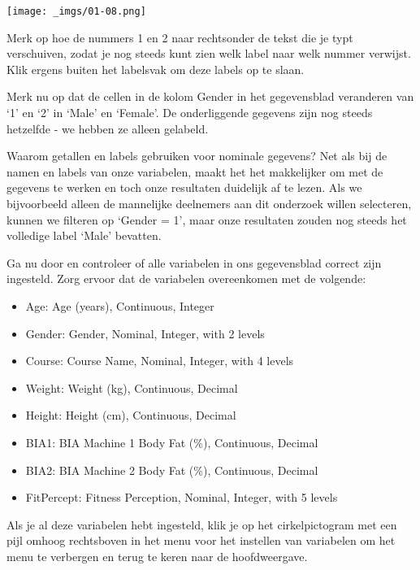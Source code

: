 \documentclass[
  letterpaper,
  DIV=11,
  numbers=noendperiod]{scrartcl}
\providecommand{\tightlist}{%
  \setlength{\itemsep}{0pt}\setlength{\parskip}{0pt}}\usepackage{longtable,booktabs,array}
\begin{document}
\texttt{[image: \_imgs/01-08.png]}

Merk op hoe de nummers 1 en 2 naar rechtsonder de tekst die je typt
verschuiven, zodat je nog steeds kunt zien welk label naar welk nummer
verwijst. Klik ergens buiten het labelsvak om deze labels op te slaan.

Merk nu op dat de cellen in de kolom Gender in het gegevensblad
veranderen van `1' en `2' in `Male' en `Female'. De onderliggende
gegevens zijn nog steeds hetzelfde - we hebben ze alleen gelabeld.

\begin{tcolorbox}[beforeafter skip=1cm, ignore nobreak=true, breakable, colframe=Aside-frame, colback=Aside-bg, coltext=Aside-text, boxsep=2mm, arc=0mm, boxrule=0.5mm]

Waarom getallen en labels gebruiken voor nominale gegevens? Net als bij
de namen en labels van onze variabelen, maakt het het makkelijker om met
de gegevens te werken en toch onze resultaten duidelijk af te lezen. Als
we bijvoorbeeld alleen de mannelijke deelnemers aan dit onderzoek willen
selecteren, kunnen we filteren op `Gender = 1', maar onze resultaten
zouden nog steeds het volledige label `Male' bevatten.

\end{tcolorbox}

Ga nu door en controleer of alle variabelen in ons gegevensblad correct
zijn ingesteld. Zorg ervoor dat de variabelen overeenkomen met de
volgende:

\begin{itemize}
\tightlist
\item
  Age: Age (years), Continuous, Integer
\item
  Gender: Gender, Nominal, Integer, with 2 levels
\item
  Course: Course Name, Nominal, Integer, with 4 levels
\item
  Weight: Weight (kg), Continuous, Decimal
\item
  Height: Height (cm), Continuous, Decimal
\item
  BIA1: BIA Machine 1 Body Fat (\%), Continuous, Decimal
\item
  BIA2: BIA Machine 2 Body Fat (\%), Continuous, Decimal
\item
  FitPercept: Fitness Perception, Nominal, Integer, with 5 levels
\end{itemize}

Als je al deze variabelen hebt ingesteld, klik je op het cirkelpictogram
met een pijl omhoog rechtsboven in het menu voor het instellen van
variabelen om het menu te verbergen en terug te keren naar de
hoofdweergave.
\end{document}
